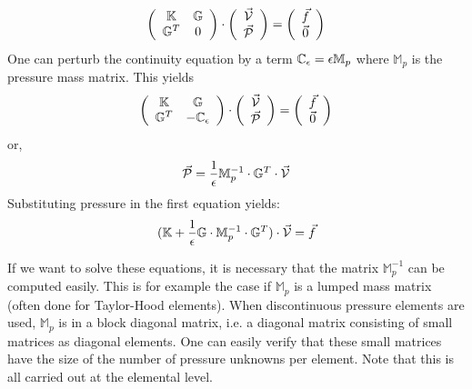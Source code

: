 \[
\left( \begin{array}{cc}
{\mathbb{K}} & {\mathbb{G}}  \\ 
{\mathbb{G}}^T & 0 
\end{array} \right) \cdot
\left( \begin{array}{c}  \vec{\cal V} \\ \vec{\cal P}  \end{array} \right) = 
\left( \begin{array}{c}  \vec{f} \\ \vec{0}  \end{array} \right) 
\]
One can perturb the continuity equation 
by a term ${\mathbb{C}}_\epsilon = \epsilon \mathbb{M}_p$
where $\mathbb{M}_p$ is the pressure mass matrix.
This yields
\[
\left( \begin{array}{cc}
{\mathbb{K}} & {\mathbb{G}}  \\ {\mathbb{G}}^T & -\mathbb{C}_\epsilon
\end{array} \right) \cdot
\left( \begin{array}{c}  \vec{\cal V} \\ \vec{\cal P}  \end{array} \right) = 
\left( \begin{array}{c}  \vec{f} \\ \vec{0}  \end{array} \right) 
\]
or,
\[
\vec{\cal P}= \frac{1}{\epsilon} \mathbb{M}_p^{-1} \cdot  {\mathbb{G}}^T \cdot \vec{\cal V}
\]
Substituting pressure in the first equation yields:
\begin{equation}
({\mathbb{K}} + \frac{1}{\epsilon} {\mathbb{G}} \cdot \mathbb{M}_p^{-1} \cdot {\mathbb{G}}^T ) \cdot \vec{\cal V} = \vec{f} 
\label{eqdpf}
\end{equation}

If we want to solve these equations, it is necessary that the matrix $\mathbb{M}_p^{-1}$
can be computed easily.
This is for example the case if $\mathbb{M}_p$
is a lumped mass matrix (often done for Taylor-Hood elements). 
When discontinuous pressure elements are used,
$\mathbb{M}_p$ is in a block diagonal matrix, i.e. a diagonal matrix consisting of small matrices as diagonal elements. One can easily verify that these small matrices have the size of the number of pressure unknowns per element. Note that this is all carried out at the elemental level.





